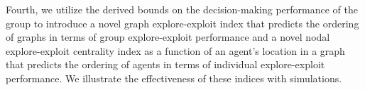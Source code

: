 \documentclass[final,5p,times,twocolumn]{elsarticle}
\theoremstyle{definition}
\begin{document}
Fourth, we utilize the derived bounds on the decision-making performance of the group to introduce a novel graph explore-exploit index that predicts the ordering of graphs in terms of group explore-exploit performance and a novel nodal explore-exploit centrality index as a function of an agent's location in a graph that predicts the ordering of agents in terms of individual explore-exploit performance. We illustrate the effectiveness of these indices with simulations. 





%
%
%
%
\end{document}
